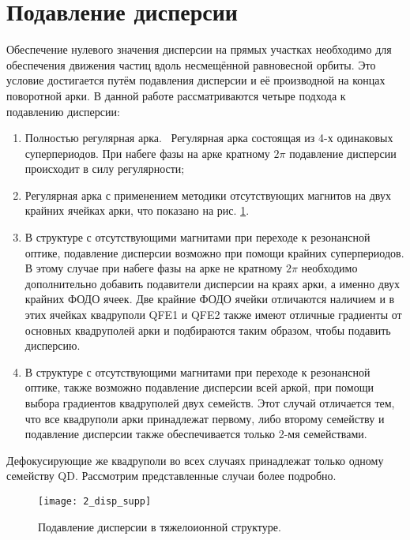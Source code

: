 \section{Подавление дисперсии}\label{sec:transition_variation/disp_supperssion}

\par Обеспечение нулевого значения дисперсии на прямых участках необходимо для обеспечения движения частиц вдоль несмещённой равновесной орбиты. Это условие достигается путём подавления дисперсии и её производной на концах поворотной арки. В данной работе рассматриваются четыре подхода к подавлению дисперсии:

\begin{enumerate} 
\item	Полностью регулярная арка. \ Регулярная арка состоящая из 4-х одинаковых суперпериодов. При набеге фазы на арке кратному $2\pi$ подавление дисперсии происходит в силу регулярности;
\item Регулярная арка с применением методики отсутствующих магнитов на двух крайних ячейках арки, что показано на рис. \ref{fig:2_disp_supp}.
\item В структуре с отсутствующими магнитами при переходе к резонансной оптике, подавление дисперсии возможно при помощи крайних суперпериодов. В этому случае при набеге фазы на арке не кратному $2\pi$ необходимо дополнительно добавить подавители дисперсии на краях арки, а именно двух крайних ФОДО ячеек. Две крайние ФОДО ячейки отличаются наличием и в этих ячейках квадруполи QFE1 и QFE2 также имеют отличные градиенты от основных квадруполей арки и подбираются таким образом, чтобы подавить дисперсию.
\item В структуре с отсутствующими магнитами при переходе к резонансной оптике, также возможно подавление дисперсии всей аркой, при помощи выбора градиентов квадруполей двух семейств. Этот случай отличается тем, что все квадруполи арки принадлежат первому, либо второму семейству и подавление дисперсии также обеспечивается только 2-мя семействами.
\end{enumerate} 

\noindent Дефокусирующие же квадруполи во всех случаях принадлежат только одному семейству QD. Рассмотрим представленные случаи  более подробно.

\begin{figure} [h!]
	\center
	\texttt{[image: 2\_disp\_supp]}
	\caption{Подавление дисперсии в тяжелоионной структуре.}
	\label{fig:2_disp_supp}
\end{figure}


